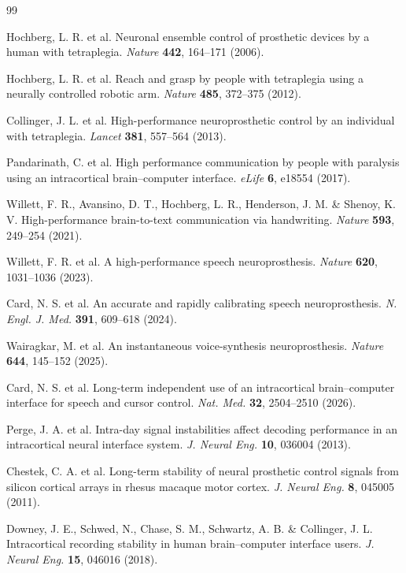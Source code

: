 \begin{thebibliography}{99}

 Hochberg, L. R. et al. Neuronal ensemble control of prosthetic devices by a human with tetraplegia. \textit{Nature} \textbf{442}, 164--171 (2006).

 Hochberg, L. R. et al. Reach and grasp by people with tetraplegia using a neurally controlled robotic arm. \textit{Nature} \textbf{485}, 372--375 (2012).

 Collinger, J. L. et al. High-performance neuroprosthetic control by an individual with tetraplegia. \textit{Lancet} \textbf{381}, 557--564 (2013).

 Pandarinath, C. et al. High performance communication by people with paralysis using an intracortical brain--computer interface. \textit{eLife} \textbf{6}, e18554 (2017).

 Willett, F. R., Avansino, D. T., Hochberg, L. R., Henderson, J. M. \& Shenoy, K. V. High-performance brain-to-text communication via handwriting. \textit{Nature} \textbf{593}, 249--254 (2021).

 Willett, F. R. et al. A high-performance speech neuroprosthesis. \textit{Nature} \textbf{620}, 1031--1036 (2023).

 Card, N. S. et al. An accurate and rapidly calibrating speech neuroprosthesis. \textit{N. Engl. J. Med.} \textbf{391}, 609--618 (2024).

 Wairagkar, M. et al. An instantaneous voice-synthesis neuroprosthesis. \textit{Nature} \textbf{644}, 145--152 (2025).

 Card, N. S. et al. Long-term independent use of an intracortical brain--computer interface for speech and cursor control. \textit{Nat. Med.} \textbf{32}, 2504--2510 (2026).

 Perge, J. A. et al. Intra-day signal instabilities affect decoding performance in an intracortical neural interface system. \textit{J. Neural Eng.} \textbf{10}, 036004 (2013).

 Chestek, C. A. et al. Long-term stability of neural prosthetic control signals from silicon cortical arrays in rhesus macaque motor cortex. \textit{J. Neural Eng.} \textbf{8}, 045005 (2011).

 Downey, J. E., Schwed, N., Chase, S. M., Schwartz, A. B. \& Collinger, J. L. Intracortical recording stability in human brain--computer interface users. \textit{J. Neural Eng.} \textbf{15}, 046016 (2018).


\end{thebibliography}
